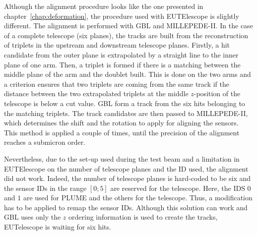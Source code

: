     Although the alignment procedure looks like the one presented in chapter~\ref{chap:deformation}, the procedure used with EUTElescope is slightly different.
    The alignment is performed with \gls{GBL} and MILLEPEDE-II.
    In the case of a complete telescope (six planes), the tracks are built from the reconstruction of triplets in the upstream and downstream telescope planes.
    Firstly, a hit candidate from the outer plane is extrapolated by a straight line to the inner plane of one arm.
    Then, a triplet is formed if there is a matching between the middle plane of the arm and the doublet built.
    This is done on the two arms and a criterion ensures that two triplets are coming from the same track if the distance between the two extrapolated triplets at the middle $z$-position of the telescope is below a cut value.
    \gls{GBL} form a track from the six hits belonging to the matching triplets.
    The track candidates are then passed to MILLEPEDE-II, which determines the shift and the rotation to apply for aligning the sensors.
    This method is applied a couple of times, until the precision of the alignment reaches a submicron order.

    Nevertheless, due to the set-up used during the test beam and a limitation in EUTElescope on the number of telescope planes and the ID used, the alignment did not work.
    Indeed, the number of telescope planes is hard-coded to be six and the sensor IDs in the range $[0; 5]$ are reserved for the telescope. 
    Here, the IDS $0$ and $1$ are used for \gls{PLUME} and the others for the telescope.
    Thus, a modification has to be applied to remap the sensor IDs. 
    Although this solution can work and \gls{GBL} uses only the $z$ ordering information is used to create the tracks, EUTelescope is waiting for six hits.



       


